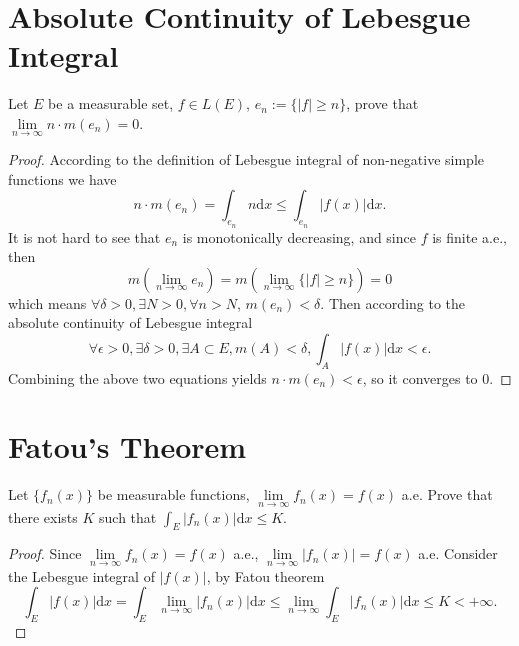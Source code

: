 \section{Absolute Continuity of Lebesgue Integral}

\begin{exercise}{}{}
  Let $E$ be a measurable set, $f \in L(E)$, $e_n := \{|f| \geq n\}$,
  prove that $\lim \limits _{n \rightarrow \infty} n \cdot m(e_n) = 0$.
\end{exercise}

\begin{proof}
  According to the definition of Lebesgue integral of non-negative simple
  functions we have
  \begin{equation}
    n \cdot m(e_n) = \int_{e_n} n \mathrm{d} x \leq \int_{e_n} |f(x)|\mathrm{d} x.
  \end{equation}
  It is not hard to see that $e_n$ is monotonically decreasing,
  and since $f$ is finite a.e., then
  \begin{equation}
    m(\lim \limits _{n \rightarrow \infty} e_n)
    = m(\lim \limits _{n \rightarrow \infty} \{|f| \geq n\}) = 0
  \end{equation}
  which means $\forall \delta > 0, \exists N > 0, \forall n > N$, $m(e_n) < \delta$.
  Then according to the absolute continuity of Lebesgue integral
  \begin{equation}
    \forall \epsilon > 0, \exists \delta > 0, \exists A \subset E, m(A) < \delta,
    \int_A |f(x)|\mathrm{d} x < \epsilon.
  \end{equation}
  Combining the above two equations yields $n\cdot m(e_n) < \epsilon$,
  so it converges to $0$.
\end{proof}

\section{Fatou's Theorem}

\begin{exercise}{}{}
  Let $\{f_n(x)\}$ be measurable functions, $\lim \limits _{n \rightarrow \infty} f_n(x) = f(x)$ a.e.
  Prove that there exists $K$ such that $\int_E |f_n(x)| \mathrm{d} x \leq K$.
\end{exercise}

\begin{proof}
  Since $\lim \limits _{n \rightarrow \infty} f_n(x) = f(x)$ a.e.,
  $\lim \limits _{n \rightarrow \infty} |f_n(x)| = f(x)$ a.e.
  Consider the Lebesgue integral of $|f(x)|$, by Fatou theorem
  \begin{equation}
    \int_E |f(x)|\mathrm{d} x = \int_E \lim \limits _{n \rightarrow \infty} |f_n(x)| \mathrm{d} x
    \leq \lim \limits _{n \rightarrow \infty} \int_E |f_n(x)|\mathrm{d} x \leq K < +\infty.
  \end{equation}
\end{proof}

